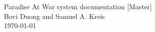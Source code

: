 \documentclass{report}
\begin{document}
\vspace*{256pt}
\begin{center}
    {\huge Paradise At War system documentation [Master]}\\[8pt]
    {\large Bovi Duong and Samuel A. Kreis}\\[4pt]
    \today
\end{center}

\newpage
\tableofcontents
\newpage


\newpage

\newpage

\newpage

\newpage

\newpage

\newpage

\end{document}
